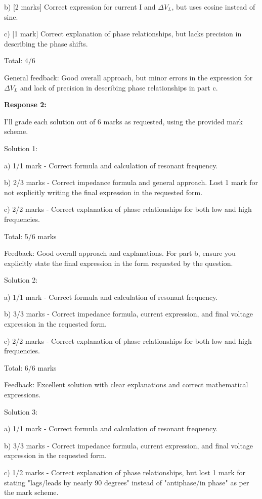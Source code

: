 \documentclass[a4paper,11pt]{article}
\begin{document}
b) [2 marks] Correct expression for current I and \(\Delta V_L \), but uses cosine instead of sine.

c) [1 mark] Correct explanation of phase relationships, but lacks precision in describing the phase shifts.

Total: 4/6

General feedback: Good overall approach, but minor errors in the expression for \(\Delta V_L \) and lack of precision in describing phase relationships in part c.

\bigskip
\textbf{Response 2:}

I'll grade each solution out of 6 marks as requested, using the provided mark scheme.

Solution 1:

a) 1/1 mark - Correct formula and calculation of resonant frequency.

b) 2/3 marks - Correct impedance formula and general approach. Lost 1 mark for not explicitly writing the final expression in the requested form.

c) 2/2 marks - Correct explanation of phase relationships for both low and high frequencies.

Total: 5/6 marks

Feedback: Good overall approach and explanations. For part b, ensure you explicitly state the final expression in the form requested by the question.

Solution 2:

a) 1/1 mark - Correct formula and calculation of resonant frequency.

b) 3/3 marks - Correct impedance formula, current expression, and final voltage expression in the requested form.

c) 2/2 marks - Correct explanation of phase relationships for both low and high frequencies.

Total: 6/6 marks

Feedback: Excellent solution with clear explanations and correct mathematical expressions.

Solution 3:

a) 1/1 mark - Correct formula and calculation of resonant frequency.

b) 3/3 marks - Correct impedance formula, current expression, and final voltage expression in the requested form.

c) 1/2 marks - Correct explanation of phase relationships, but lost 1 mark for stating "lags/leads by nearly 90 degrees" instead of "antiphase/in phase" as per the mark scheme.
\end{document}
